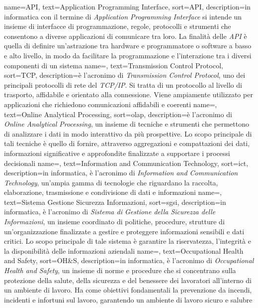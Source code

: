 {
    name={API},
    text=Application Programming Interface,
    sort=API,
    description={in informatica con il termine di \textit{Application Programming Interface} si intende un insieme di interfacce di 
    programmazione, regole, protocolli e strumenti che consentono a diverse applicazioni di comunicare tra loro. La finalità delle 
    \textit{API} è quella di definire un'astrazione tra hardware e programmatore o software a basso e alto livello, in modo da facilitare
    la programmazione e l'interazione tra i diversi componenti di un sistema}
}
 {
    name=,
    text=Transmission Control Protocol,
    sort=TCP,
    description={è l'acronimo di \textit{Transmission Control Protocol}, uno dei principali protocolli di rete del \textit{TCP/IP}. Si tratta di un 
    protocollo al livello di trasporto, affidabile e orientato alla connessione. Viene ampiamente utilizzato per applicazioni 
    che richiedono comunicazioni affidabili e coerenti}
}
 {
    name=,
    text=Online Analytical Processing,
    sort=olap,
    description={è l'acronimo di \textit{Online Analytical Processing}, un insieme di tecniche e strumenti che permettono di analizzare i dati in modo 
    interattivo da più prospettive. Lo scopo principale di tali tecniche è quello di fornire, attraverso aggregazioni e compattazioni dei dati, informazioni 
    significative e approfondite finalizzate a supportare i processi decisionali}
}
 {
    name=,
    text=Information and Communication Technology,
    sort=ict,
    description={in informatica, è l'acronimo di \textit{Information and Communication Technology}, un'ampia gamma di tecnologie che riguardano la raccolta, 
    elaborazione, trasmissione e condivisione di dati e informazioni}
}
 {
    name=,
    text=Sistema Gestione Sicurezza Informazioni,
    sort=sgsi,
    description={in informatica, è l'acronimo di \textit{Sistema di Gestione della Sicurezza delle Informazioni}, un insieme coordinato di politiche, procedure, strutture di un'organizzazione finalizzate a 
    gestire e proteggere informazioni sensibili e dati critici. Lo scopo principale di tale sistema è garantire la riservatezza, l'integrità 
    e la disponibilità delle informazioni aziendali}
}
 {
    name=,
    text=Occupational Health and Safety,
    sort=OH\&S,
    description={in informatica, è l'acronimo di \textit{Occupational Health and Safety}, un insieme di norme e procedure che si concentrano 
    sulla protezione della salute, della sicurezza e del benessere dei lavoratori all'interno di un ambiente di lavoro. Ha come obiettivi 
    fondamentali la prevenzione da incendi, incidenti e infortuni sul lavoro, garantendo un ambiente di lavoro sicuro e salubre}
}
